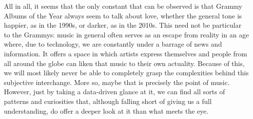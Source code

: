 \documentclass{article}
\begin{document}









\FloatBarrier

All in all, it seems that the only constant that can be observed is that Grammy Albums of the Year always seem to talk about love, whether the general tone is happier, as in the 1990s, or darker, as in the 2010s. This need not be particular to the Grammys: music in general often serves as an escape from reality in an age where, due to technology, we are constantly under a barrage of news and information. It offers a space in which artists express themselves and people from all around the globe can liken that music to their own actuality. Because of this, we will most likely never be able to completely grasp the complexities behind this subjective interchange. More so, maybe that is precisely the point of music. However, just by taking a data-driven glance at it, we can find all sorts of patterns and curiosities that, although falling short of giving us a full understanding, do offer a deeper look at it than what meets the eye.




\FloatBarrier
\nocite{*}








\end{document}
